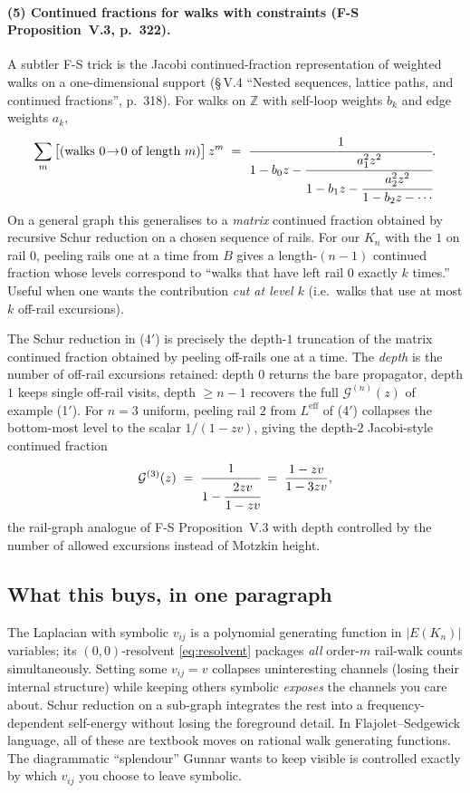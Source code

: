 \documentclass[11pt,a4paper]{article}
\begin{document}
\paragraph{(5) Continued fractions for walks with constraints
(F-S Proposition~V.3, p.~322).}
A subtler F-S trick is the Jacobi continued-fraction representation of
weighted walks on a one-dimensional support (\S\,V.4 ``Nested
sequences, lattice paths, and continued fractions'', p.~318). For walks on $\mathbb Z$ with
self-loop weights $b_k$ and edge weights $a_k$,
\[
\sum_{m}\big[(\text{walks }0\!\to\!0\text{ of length }m)\big]\,z^{m}
\;=\;
\cfrac{1}{1 - b_0 z - \cfrac{a_1^{2}z^{2}}{1 - b_1 z - \cfrac{a_2^{2}z^{2}}{1 - b_2 z - \cdots}}}.
\]
On a general graph this generalises to a \emph{matrix} continued
fraction obtained by recursive Schur reduction on a chosen sequence of
rails. For our $K_n$ with the $1$ on rail $0$, peeling rails one at a
time from $B$ gives a length-$(n-1)$ continued fraction whose levels
correspond to ``walks that have left rail $0$ exactly $k$ times.''
Useful when one wants the contribution \emph{cut at level $k$} (i.e.\
walks that use at most $k$ off-rail excursions).

\begin{examplebox}[title={Example (5$'$)\;\;Matrix continued-fraction peel at $n{=}3$}]
The Schur reduction in (4$'$) is precisely the depth-$1$ truncation of
the matrix continued fraction obtained by peeling off-rails one at a
time. The \emph{depth} is the number of off-rail excursions retained:
depth $0$ returns the bare propagator, depth $1$ keeps single off-rail
visits, depth $\geq n{-}1$ recovers the full $\mathcal G^{(n)}(z)$ of
example (1$'$). For $n{=}3$ uniform, peeling rail $2$ from
$L^{\text{eff}}$ of (4$'$) collapses the bottom-most level to the
scalar $1/(1-zv)$, giving the depth-$2$ Jacobi-style continued fraction
\[
\mathcal G^{(3)}(z) \;=\;
\cfrac{1}{1 - \cfrac{2zv}{1 - zv}}
\;=\; \frac{1-zv}{1-3zv},
\]
the rail-graph analogue of F-S Proposition~V.3 with depth controlled
by the number of allowed excursions instead of Motzkin height.
\end{examplebox}

\subsection*{What this buys, in one paragraph}
The Laplacian with symbolic $v_{ij}$ is a polynomial generating function
in $|E(K_n)|$ variables; its $(0,0)$-resolvent
\eqref{eq:resolvent} packages \emph{all} order-$m$ rail-walk counts
simultaneously. Setting some $v_{ij}=v$ collapses uninteresting channels
(losing their internal structure) while keeping others symbolic
\emph{exposes} the channels you care about. Schur reduction on a
sub-graph integrates the rest into a frequency-dependent self-energy
without losing the foreground detail. In Flajolet--Sedgewick language,
all of these are textbook moves on rational walk generating functions.
The diagrammatic ``splendour'' Gunnar wants to keep visible is
controlled exactly by which $v_{ij}$ you choose to leave symbolic.
\end{document}
